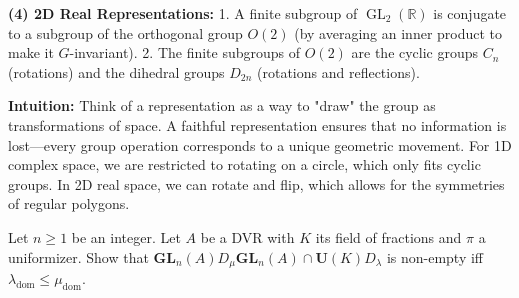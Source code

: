 \begin{solution}
\textbf{(4) 2D Real Representations:}
1. A finite subgroup of $\operatorname{GL}_2(\mathbb{R})$ is conjugate to a subgroup of the orthogonal group $O(2)$ (by averaging an inner product to make it $G$-invariant).
2. The finite subgroups of $O(2)$ are the cyclic groups $C_n$ (rotations) and the dihedral groups $D_{2n}$ (rotations and reflections).

\textbf{Intuition:}
Think of a representation as a way to "draw" the group as transformations of space. A faithful representation ensures that no information is lost—every group operation corresponds to a unique geometric movement. For 1D complex space, we are restricted to rotating on a circle, which only fits cyclic groups. In 2D real space, we can rotate and flip, which allows for the symmetries of regular polygons.
\end{solution}

\begin{exercise}
\label{algebra:2024:2}
Let $n \geq 1$ be an integer. Let $A$ be a DVR with $K$ its field of fractions and $\pi$ a uniformizer.
Show that $\mathbf{GL}_n(A) D_\mu \mathbf{GL}_n(A) \cap \mathbf{U}(K) D_\lambda$ is non-empty iff $\lambda_{\mathrm{dom}} \leq \mu_{\mathrm{dom}}$.
\end{exercise}

